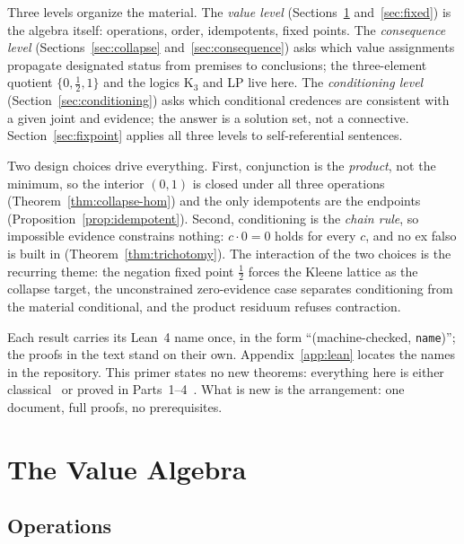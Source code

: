 \documentclass[11pt,a4paper]{article}
\begin{document}
Three levels organize the material.
The \emph{value level} (Sections~\ref{sec:algebra}
and~\ref{sec:fixed}) is the algebra itself: operations, order,
idempotents, fixed points.
The \emph{consequence level} (Sections~\ref{sec:collapse}
and~\ref{sec:consequence}) asks which value assignments propagate
designated status from premises to conclusions; the three-element
quotient $\{0, \tfrac{1}{2}, 1\}$ and the logics K$_3$ and LP live
here.
The \emph{conditioning level} (Section~\ref{sec:conditioning}) asks
which conditional credences are consistent with a given joint and
evidence; the answer is a solution set, not a connective.
Section~\ref{sec:fixpoint} applies all three levels to
self-referential sentences.

Two design choices drive everything.
First, conjunction is the \emph{product}, not the minimum, so the
interior $(0,1)$ is closed under all three operations
(Theorem~\ref{thm:collapse-hom}) and the only idempotents are the
endpoints (Proposition~\ref{prop:idempotent}).
Second, conditioning is the \emph{chain rule}, so impossible evidence
constrains nothing: $c \cdot 0 = 0$ holds for every $c$, and no ex
falso is built in (Theorem~\ref{thm:trichotomy}).
The interaction of the two choices is the recurring theme: the
negation fixed point $\tfrac{1}{2}$ forces the Kleene lattice as the
collapse target, the unconstrained zero-evidence case separates
conditioning from the material conditional, and the product residuum
refuses contraction.

Each result carries its Lean~4 name once, in the form
``(machine-checked, \texttt{name})''; the proofs in the text stand on
their own.
Appendix~\ref{app:lean} locates the names in the repository.
This primer states no new theorems: everything here is either
classical~\cite{kleene1952,hajek1998,klement2000} or proved in
Parts~1--4~\cite{part1,part2}.
What is new is the arrangement: one document, full proofs, no
prerequisites.

\section{The Value Algebra}
\label{sec:algebra}

\subsection{Operations}
\end{document}
